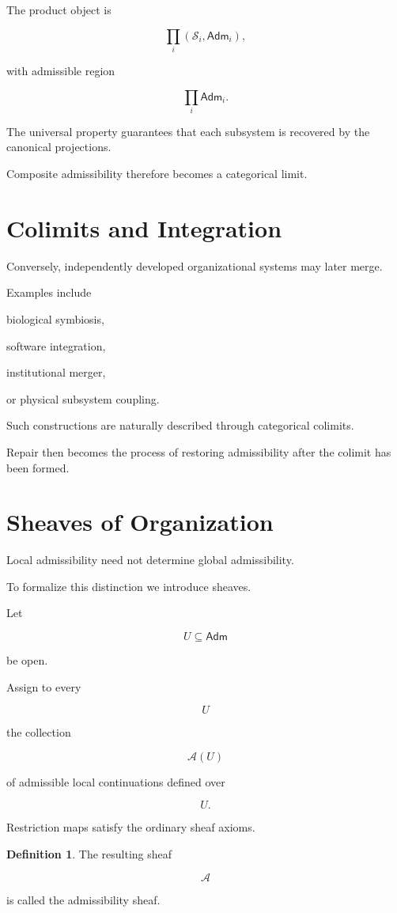 \documentclass[11pt,oneside]{book}
\numberwithin{equation}{chapter}
\theoremstyle{definition}
\newtheorem{definition}{Definition}[chapter]
\theoremstyle{plain}
\newcommand{\State}{\mathcal{S}}
\newcommand{\Adm}{\mathsf{Adm}}
\begin{document}
The product object is

\[
\prod_i
(\State_i,\Adm_i),
\]

with admissible region

\[
\prod_i
\Adm_i.
\]

The universal property guarantees that each subsystem is recovered by the
canonical projections.

Composite admissibility therefore becomes a categorical limit.

\section{Colimits and Integration}

Conversely, independently developed organizational systems may later merge.

Examples include

biological symbiosis,

software integration,

institutional merger,

or physical subsystem coupling.

Such constructions are naturally described through categorical colimits.

Repair then becomes the process of restoring admissibility after the colimit
has been formed.

\section{Sheaves of Organization}

Local admissibility need not determine global admissibility.

To formalize this distinction we introduce sheaves.

Let

\[
U
\subseteq
\Adm
\]

be open.

Assign to every

\[
U
\]

the collection

\[
\mathscr A(U)
\]

of admissible local continuations defined over

\[
U.
\]

Restriction maps satisfy the ordinary sheaf axioms.

\begin{definition}

The resulting sheaf

\[
\mathscr A
\]

is called the admissibility sheaf.

\end{definition}
\end{document}
